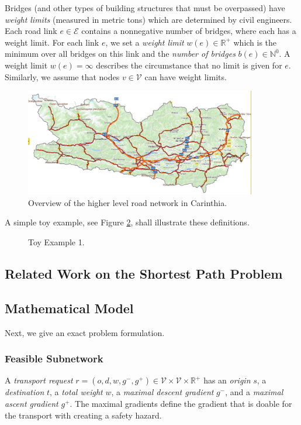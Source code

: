 Bridges (and other types of building structures that must be overpassed)
have \emph{weight limits} (measured in metric tons) which are determined by civil engineers.
Each road link $e \in \mathcal{E}$ contains a nonnegative number of bridges, where each has a weight limit.
For each link $e$, we set a \emph{weight limit} $w(e) \in \mathbb{R}^{+}$ which is the
minimum over all bridges on this link and the \emph{number of bridges} $b(e) \in \mathbb{N}^{0}$.
A weight limit $w(e)= \infty$ describes the circumstance
that no limit is given for $e$.
Similarly, we assume that nodes $v \in \mathcal{V}$ can have weight limits.
\begin{figure}[!ht]
  \centering
  \includegraphics[width=0.9\textwidth]{map.jpg}
  \caption{Overview of the higher level road network in Carinthia.}
  \label{fig:higher level}
\end{figure}


A simple toy example, see Figure \ref{fig_toy_example_1}, shall illustrate these definitions.
\begin{figure}[!ht]
  \centering
  
  \caption{Toy Example 1.}
  \label{fig_toy_example_1}
\end{figure}


\subsection{Related Work on the Shortest Path Problem}

\citet{TACCARI2016122, zhu2014vehicle, Osegueda.1999}

\subsection{Mathematical Model}

Next, we give an exact problem formulation.

\subsubsection{Feasible Subnetwork}
A \emph{transport request} $r=(o,d,w,g^{-},g^{+}) \in \mathcal{V} \times \mathcal{V} \times \mathbb{R}^{+}$
has an \emph{origin} $s$, a \emph{destination} $t$, a \emph{total weight} $w$,
a \emph{maximal descent gradient} $g^{-}$, and a \emph{maximal ascent gradient} $g^{+}$.
The maximal gradients define the gradient that is doable for the transport with
creating a safety hazard.


